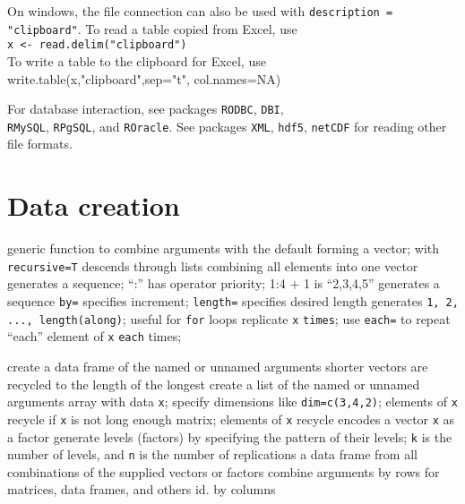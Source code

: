 On windows, the file connection can also be used with {\tt description =
"clipboard"}. To read a table copied from Excel, use \\
{\tt x <- read.delim("clipboard")}\\
To write a table to the clipboard for Excel, use \\
{\smalltt write.table(x,"clipboard",sep="\bs t", col.names=NA)}

For database interaction, see packages {\tt RODBC}, {\tt DBI},\\
{\tt RMySQL}, {\tt RPgSQL}, and {\tt ROracle}. See packages {\tt XML},
{\tt hdf5}, {\tt netCDF} for reading other file formats.

\section{Data creation}{}

	{generic function to combine arguments with the default forming a vector; with {\tt recursive=T} descends through lists combining all elements into one vector}
	{generates a sequence; ``:'' has operator priority; 1:4 + 1 is ``2,3,4,5''}
	{generates a sequence {\tt by=} specifies increment; {\tt length=} specifies desired length}
	{generates {\tt 1, 2, ..., length(along)}; useful for {\tt for} loops}
	{replicate {\tt x} {\tt times}; use {\tt each=} to repeat ``each'' element of {\tt x} {\tt each} times;}

	{create a data frame of the named or unnamed arguments}
	{shorter vectors are recycled to the length of the longest}
	{create a list of the named or unnamed arguments }
	{array with data {\tt x}; specify dimensions like {\tt dim=c(3,4,2)}; elements of {\tt x} recycle if {\tt x} is not long enough}
	{matrix; elements of {\tt x} recycle}
	{encodes a vector {\tt x} as a factor}
	{generate levels (factors) by specifying the pattern of their levels; {\tt k} is the number of levels, and {\tt n} is the number of replications}
	{a data frame from all combinations of the supplied vectors or factors}
	{combine arguments by rows for matrices, data frames, and others}
	{id. by columns}
